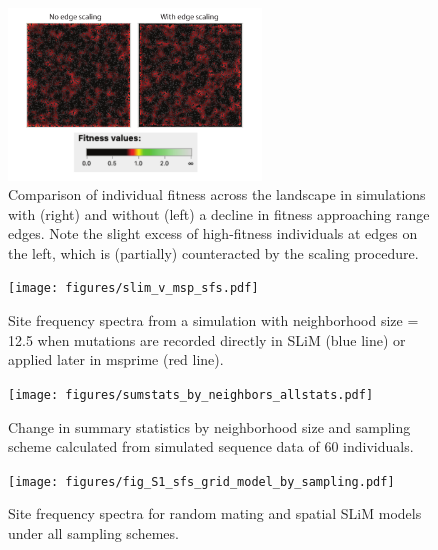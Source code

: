 \documentclass[10pt,twoside,lineno,hidelinks]{preprint}
\begin{document}
\begin{figure}[p]
\centering
\includegraphics[width=0.6\textwidth]{figures/edge_scaling_comp.pdf}
\caption{Comparison of individual fitness across the landscape in simulations with (right) and without (left) a decline in fitness approaching range edges. Note the slight excess of high-fitness individuals at edges on the left, which is (partially) counteracted by the scaling procedure.}
\label{fig:edge_scaling} 
\end{figure}
\FloatBarrier


\begin{figure}[p]
\centering
\texttt{[image: figures/slim\_v\_msp\_sfs.pdf]}
\caption{Site frequency spectra from a simulation with neighborhood size = 12.5 when mutations are recorded directly in SLiM (blue line) or applied later in msprime (red line).}
\label{fig:slim_v_msp_sfs2} 
\end{figure}
\FloatBarrier



\afterpage{\clearpage}
\begin{figure}[p]
\centering
\texttt{[image: figures/sumstats\_by\_neighbors\_allstats.pdf]}
\caption{Change in summary statistics by neighborhood size and sampling scheme calculated from simulated sequence data of 60 individuals.}
\label{fig:allsumstats} 
\end{figure}
\FloatBarrier


\begin{figure}[p]
\centering
\texttt{[image: figures/fig\_S1\_sfs\_grid\_model\_by\_sampling.pdf]}
\caption{Site frequency spectra for random mating and spatial SLiM models under all sampling schemes.}
\label{fig:allsfs}
\end{figure}
\FloatBarrier
\end{document}
